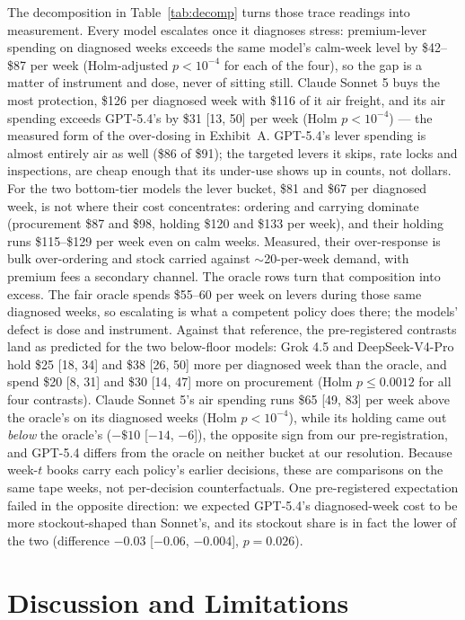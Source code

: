 \documentclass{article}
\begin{document}
The decomposition in Table~\ref{tab:decomp} turns those trace readings into
measurement. Every model escalates once it diagnoses stress: premium-lever
spending on diagnosed weeks exceeds the same model's calm-week level by
\$42--\$87 per week (Holm-adjusted $p < 10^{-4}$ for each of the four), so
the gap is a matter of instrument and dose, never of sitting still. Claude
Sonnet 5 buys the most protection, \$126 per diagnosed week with \$116 of
it air freight, and its air spending exceeds GPT-5.4's by \$31 [13, 50] per
week (Holm $p < 10^{-4}$) --- the measured form of the over-dosing in
Exhibit~A. GPT-5.4's lever spending is almost entirely air as well (\$86 of
\$91); the targeted levers it skips, rate locks and inspections, are cheap
enough that its under-use shows up in counts, not dollars. For the two
bottom-tier models the lever bucket, \$81 and \$67 per diagnosed week, is
not where their cost concentrates: ordering and carrying dominate
(procurement \$87 and \$98, holding \$120 and \$133 per week), and their
holding runs \$115--\$129 per week even on calm weeks. Measured,
their over-response is bulk over-ordering and stock carried against
$\sim$20-per-week demand, with premium fees a secondary channel.
The oracle rows turn that composition into excess. The fair oracle spends
\$55--60 per week on levers during those same diagnosed weeks, so
escalating is what a competent policy does there; the models' defect is
dose and instrument. Against that reference, the pre-registered contrasts
land as predicted for the two below-floor models: Grok 4.5 and
DeepSeek-V4-Pro hold \$25 [18, 34] and \$38 [26, 50] more per diagnosed
week than the oracle, and spend \$20 [8, 31] and \$30 [14, 47] more on
procurement (Holm $p \le 0.0012$ for all four contrasts). Claude Sonnet
5's air spending runs \$65 [49, 83] per week above the oracle's on its
diagnosed weeks (Holm $p < 10^{-4}$), while its holding came out
\emph{below} the oracle's ($-\$10$ [$-14$, $-6$]), the opposite sign
from our pre-registration, and GPT-5.4 differs from the oracle on
neither bucket at our resolution. Because week-$t$ books carry each
policy's earlier decisions, these are comparisons on the same tape
weeks, not per-decision counterfactuals. One
pre-registered expectation failed in the opposite direction: we expected
GPT-5.4's diagnosed-week cost to be more stockout-shaped than Sonnet's,
and its stockout share is in fact the lower of the two (difference
$-0.03$ [$-0.06$, $-0.004$], $p = 0.026$).

\section{Discussion and Limitations}
\label{sec:discussion}
\end{document}
